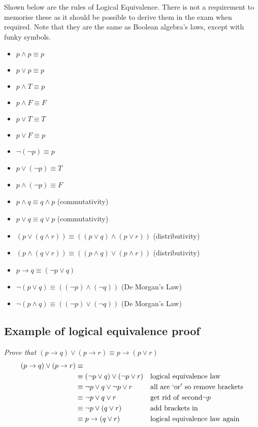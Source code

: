 Shown below are the rules of Logical Equivalence. There is not a requirement to memorise these as it should be possible to derive them in the exam when required. Note that they are the same as Boolean algebra's laws, except with funky symbols.
\begin{itemize}
    \item $p \wedge p \equiv p$
    \item $p \vee p \equiv p$
    \item $p \wedge T \equiv p$
    \item $p \wedge F \equiv F$
    \item $p \vee T \equiv T$
    \item $p \vee F \equiv p$
    \item $\neg (\neg p) \equiv p$
    \item $p \vee (\neg p) \equiv T$
    \item $p \wedge (\neg p) \equiv F$
    \item $p \wedge q \equiv q \wedge p$ (commutativity)
    \item $p \vee q \equiv q \vee p$ (commutativity)
    \item $(p \vee (q \wedge r)) \equiv ((p \vee q) \wedge (p \vee r))$ (distributivity)
    \item $(p \wedge (q \vee r)) \equiv ((p \wedge q) \vee (p \wedge r))$ (distributivity)
    \item $p \rightarrow q \equiv (\neg p \vee q)$
    \item $\neg (p \vee q) \equiv ((\neg p)\wedge(\neg q))$ (De Morgan's Law)
    \item $\neg (p \wedge q) \equiv ((\neg p)\vee(\neg q))$ (De Morgan's Law)
\end{itemize}

\subsection{Example of logical equivalence proof}
\textit{Prove that $(p\rightarrow q) \vee (p \rightarrow r) \equiv p \rightarrow (p \vee r)$}
\begin{align*}
    (p\rightarrow q) \vee (p \rightarrow r) &\equiv  &&\\
    & \equiv (\neg p \vee q) \vee (\neg p \vee r) && \mathrm{logical\ equivalence\ law}\\
    & \equiv \neg p \vee q \vee \neg p \vee r && \mathrm{all\ are\ `or'\ so\ remove\ brackets}\\
    & \equiv \neg p \vee q \vee r && \mathrm{get\ rid\ of\ second} \neg p\\
    & \equiv \neg p \vee (q \vee r)&& \mathrm{add\ brackets\ in} \\
    & \equiv p \rightarrow (q \vee r) && \mathrm{logical\ equivalence\ law\ again}
\end{align*}

